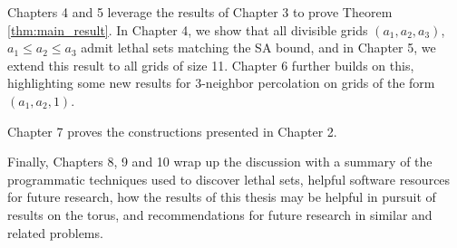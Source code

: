 Chapters 4 and 5 leverage the results of Chapter 3 to prove Theorem \ref{thm:main_result}. In Chapter 4, we show that all divisible grids $(a_1,a_2,a_3)$, $a_1 \leq a_2 \leq a_3$ admit lethal sets matching the SA bound, and in Chapter 5, we extend this result to all grids of size 11. Chapter 6 further builds on this, highlighting some new results for 3-neighbor percolation on grids of the form $(a_1,a_2,1)$.

Chapter 7 proves the constructions presented in Chapter 2.

Finally, Chapters 8, 9 and 10 wrap up the discussion with a summary of the programmatic techniques used to discover lethal sets, helpful software resources for future research, how the results of this thesis may be helpful in pursuit of results on the torus, and recommendations for future research in similar and related problems. 





